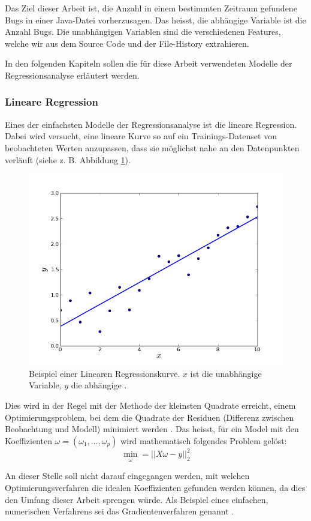 \documentclass[10pt, a4paper]{article}
\begin{document}
Das Ziel dieser Arbeit ist, die Anzahl in einem bestimmten Zeitraum gefundene Bugs in einer Java-Datei vorherzusagen. Das heisst, die abhängige Variable ist die Anzahl Bugs. Die unabhängigen Variablen sind die verschiedenen Features, welche wir aus dem Source Code und der File-History extrahieren.

In den folgenden Kapiteln sollen die für diese Arbeit verwendeten Modelle der Regressionsanalyse erläutert werden.

\subsubsection{Lineare Regression} \label{sec:linreg}
Eines der einfachsten Modelle der Regressionsanalyse ist die lineare Regression. Dabei wird versucht, eine lineare Kurve so auf ein Trainings-Datenset von beobachteten Werten anzupassen, dass sie möglichst nahe an den Datenpunkten verläuft (siehe z. B. Abbildung \ref{fig:linreg}).

\begin{figure}[h]
\centering
\includegraphics[width=0.7\linewidth]{resources/images/linreg}
\caption{Beispiel einer Linearen Regressionskurve. \(x\) ist die unabhängige Variable, \(y\) die abhängige \cite{netprophetlocalregression}.}
\label{fig:linreg}
\end{figure}

Dies wird in der Regel mit der Methode der kleinsten Quadrate erreicht, einem Optimierungsproblem, bei dem die Quadrate der Residuen (Differenz zwischen Beobachtung und Modell) minimiert werden \cite{sklearnlinearmodel}.
Das heisst, für ein Model mit den Koeffizienten \(\omega = (\omega_1, \dots, \omega_p)\) wird mathematisch folgendes Problem gelöst:
\[
\min_{\omega} = ||X\omega - y||_2^2
\]

An dieser Stelle soll nicht darauf eingegangen werden, mit welchen Optimierungsverfahren die idealen Koeffizienten gefunden werden können, da dies den Umfang dieser Arbeit sprengen würde. Als Beispiel eines einfachen, numerischen Verfahrens sei das Gradientenverfahren genannt \cite{gradientdescent}.
\end{document}
